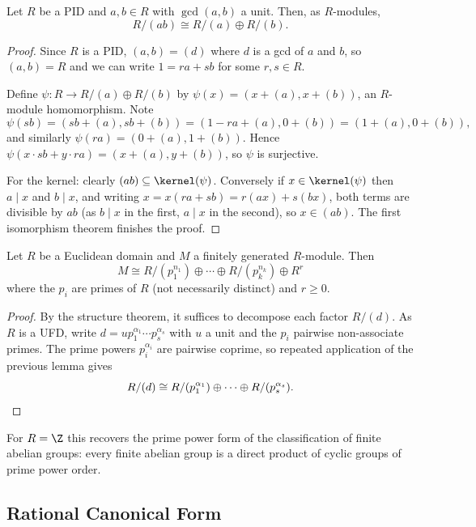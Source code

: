 \begin{lemma}
	Let $R$ be a PID and $a, b \in R$ with $\gcd(a, b)$ a unit. Then, as $R$-modules,
	$$
	R/(ab) \cong R/(a) \oplus R/(b).
	$$
\end{lemma}
\begin{proof}
	Since $R$ is a PID, $(a, b) = (d)$ where $d$ is a gcd of $a$ and $b$, so $(a,b) = R$ and we can write $1 = ra + sb$ for some $r, s \in R$.

	Define $\psi: R \rightarrow R/(a) \oplus R/(b)$ by $\psi(x) = (x + (a), x + (b))$, an $R$-module homomorphism. Note
	$$
	\psi(sb) = (sb + (a), sb + (b)) = (1 - ra + (a), 0 + (b)) = (1 + (a), 0 + (b)),
	$$
	and similarly $\psi(ra) = (0 + (a), 1 + (b))$. Hence $\psi(x \cdot sb + y \cdot ra) = (x + (a), y + (b))$, so $\psi$ is surjective.

	For the kernel: clearly $(ab) \subseteq \kernel(\psi)$. Conversely if $x \in \kernel(\psi)$ then $a \mid x$ and $b \mid x$, and writing $x = x(ra + sb) = r(ax) + s(bx)$, both terms are divisible by $ab$ (as $b \mid x$ in the first, $a \mid x$ in the second), so $x \in (ab)$. The first isomorphism theorem finishes the proof.
\end{proof}

\begin{theorem}
	Let $R$ be a Euclidean domain and $M$ a finitely generated $R$-module. Then
	$$
	M \cong R/(p_1^{n_1}) \oplus \cdots \oplus R/(p_k^{n_k}) \oplus R^r
	$$
	where the $p_i$ are primes of $R$ (not necessarily distinct) and $r \geq 0$.
\end{theorem}
\begin{proof}
	By the structure theorem, it suffices to decompose each factor $R/(d)$. As $R$ is a UFD, write $d = u p_1^{\alpha_1}\cdots p_s^{\alpha_s}$ with $u$ a unit and the $p_i$ pairwise non-associate primes. The prime powers $p_i^{\alpha_i}$ are pairwise coprime, so repeated application of the previous lemma gives
	$$
	R/(d) \cong R/(p_1^{\alpha_1}) \oplus \cdots \oplus R/(p_s^{\alpha_s}). \qedhere
	$$
\end{proof}

For $R = \Z$ this recovers the prime power form of the classification of finite abelian groups: every finite abelian group is a direct product of cyclic groups of prime power order.

\subsection{Rational Canonical Form}

